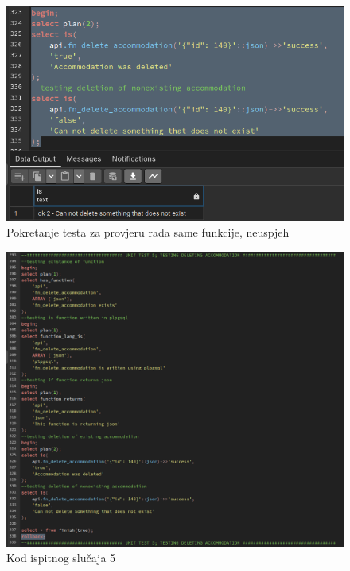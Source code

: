				\begin{figure}[H]
					\centering
					\includegraphics[width=\textwidth]{slike/unit_tests/ut_5/failure_invocation.png}
					\caption{Pokretanje testa za provjeru rada same funkcije, neuspjeh}
					\label{fig: IS5-smještaj je već izbrisan ili ne postoji}
				\end{figure}
				\begin{figure}[H]
					\centering
					\includegraphics[width=\textwidth]{slike/unit_tests/ut_5/code.png}
					\caption{Kod ispitnog slučaja 5}
					\label{fig: IS5-kod}
				\end{figure}
				\eject
